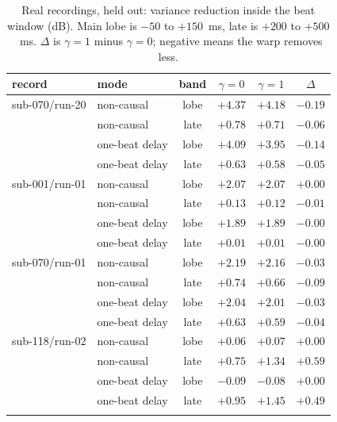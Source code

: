 \begin{table}[!ht]
\centering
\small
\caption{Real recordings, held out: variance reduction inside the beat window (dB).
Main lobe is $-50$ to $+150$~ms, late is $+200$ to $+500$~ms. $\Delta$ is
$\gamma{=}1$ minus $\gamma{=}0$; negative means the warp removes less.}
\label{tab:real}
\begin{tabular}{@{}llcccc@{}}
\toprule
record & mode & band & $\gamma{=}0$ & $\gamma{=}1$ & $\Delta$ \\
\midrule
sub-070/run-20 & non-causal & lobe & $+4.37$ & $+4.18$ & $-0.19$ \\
 & non-causal & late & $+0.78$ & $+0.71$ & $-0.06$ \\
 & one-beat delay & lobe & $+4.09$ & $+3.95$ & $-0.14$ \\
 & one-beat delay & late & $+0.63$ & $+0.58$ & $-0.05$ \\
\addlinespace[2pt]
sub-001/run-01 & non-causal & lobe & $+2.07$ & $+2.07$ & $+0.00$ \\
 & non-causal & late & $+0.13$ & $+0.12$ & $-0.01$ \\
 & one-beat delay & lobe & $+1.89$ & $+1.89$ & $-0.00$ \\
 & one-beat delay & late & $+0.01$ & $+0.01$ & $-0.00$ \\
\addlinespace[2pt]
sub-070/run-01 & non-causal & lobe & $+2.19$ & $+2.16$ & $-0.03$ \\
 & non-causal & late & $+0.74$ & $+0.66$ & $-0.09$ \\
 & one-beat delay & lobe & $+2.04$ & $+2.01$ & $-0.03$ \\
 & one-beat delay & late & $+0.63$ & $+0.59$ & $-0.04$ \\
\addlinespace[2pt]
sub-118/run-02 & non-causal & lobe & $+0.06$ & $+0.07$ & $+0.00$ \\
 & non-causal & late & $+0.75$ & $+1.34$ & $+0.59$ \\
 & one-beat delay & lobe & $-0.09$ & $-0.08$ & $+0.00$ \\
 & one-beat delay & late & $+0.95$ & $+1.45$ & $+0.49$ \\
\addlinespace[2pt]
\bottomrule
\end{tabular}
\end{table}
